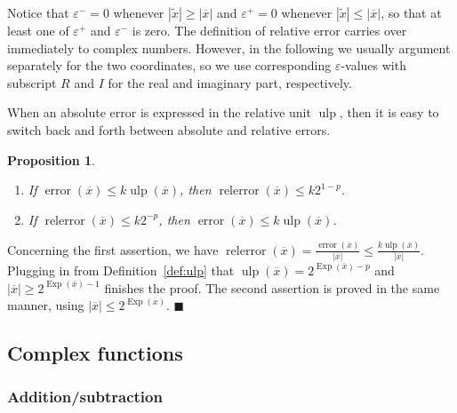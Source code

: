 \documentclass {article}
\newcommand {\corr}[1]{\widetilde {#1}}
\newcommand {\appro}[1]{\overline {#1}}
\newcommand {\Ulp}{{\operatorname {ulp}}}
\DeclareMathOperator{\Exp}{\operatorname {Exp}}
\newcommand{\error}{\operatorname {error}}
\newcommand{\relerror}{\operatorname {relerror}}
\renewcommand {\epsilon}{\varepsilon}
\renewcommand {\leq}{\leqslant}
\renewcommand {\geq}{\geqslant}
\newtheorem{prop}[theorem]{Proposition}
\newenvironment{proof}{\noindent{\bf Proof:}}{{\hspace* {\fill}$\blacksquare$}}
\begin{document}
Notice that $\epsilon^- = 0$ whenever $|\corr x| \geq |\appro x|$
and $\epsilon^+ = 0$ whenever $|\corr x| \leq |\appro x|$, so that
at least one of $\epsilon^+$ and $\epsilon^-$ is zero.
The definition of relative error carries over immediately to complex numbers.
However, in the following we usually argument separately for the two coordinates,
so we use corresponding $\epsilon$-values with subscript $R$ and $I$ for the
real and imaginary part, respectively.

When an absolute error is expressed in the relative unit $\Ulp$, then
it is easy to switch back and forth between absolute and relative errors.

\begin {prop}
\label {prop:relerror}
\quad \\
\begin {enumerate}
\item
If $\error (\appro x) \leq k \Ulp (\appro x)$,
then $\relerror (\appro x) \leq k 2^{1 - p}$.
\item
If $\relerror (\appro x) \leq k 2^{-p}$,
then $\error (\appro x) \leq k \Ulp (\appro x)$.
\end {enumerate}
\end {prop}

\begin {proof}
Concerning the first assertion, we have
$
\relerror (\appro x) = \frac {\error (\appro x)}{|\appro x|}
\leq
\frac {k \Ulp (\appro x)}{|\appro x|}.
$
Plugging in from Definition~\ref {def:ulp} that
$\Ulp (\appro x) = 2^{\Exp (\appro x) - p}$ and
$|\appro x| \geq 2^{\Exp (\appro x) - 1}$ finishes the proof.
The second assertion is proved in the same manner, using
$|\appro x| \leq 2^{\Exp (\appro x)}$.
\end {proof}


\subsection {Complex functions}

\subsubsection {Addition/subtraction}
\end{document}
